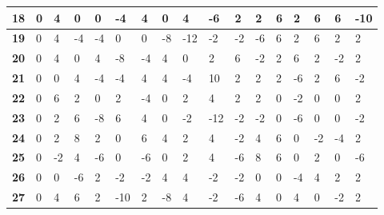 \begin{longtable}[c]{|l|l|l|l|l|l|l|l|l|l|l|l|l|l|l|l|l|}
\textbf{18} & 0          & 4          & 0          & 0          & -4         & 4          & 0          & 4          & -6         & 2          & 2           & 6           & 2           & 6           & 6           & -10          \\ \hline
\textbf{19} & 0          & 4          & -4         & -4         & 0          & 0          & -8         & -12        & -2         & -2         & -6          & 6           & 2           & 6           & 2           & 2            \\ \hline
\textbf{20} & 0          & 4          & 0          & 4          & -8         & -4         & 4          & 0          & 2          & 6          & -2          & 2           & 6           & 2           & -2          & 2            \\ \hline
\textbf{21} & 0          & 0          & 4          & -4         & -4         & 4          & 4          & -4         & 10         & 2          & 2           & 2           & -6          & 2           & 6           & -2           \\ \hline
\textbf{22} & 0          & 6          & 2          & 0          & 2          & -4         & 0          & 2          & 4          & 2          & 2           & 0           & -2          & 0           & 0           & 2            \\ \hline
\textbf{23} & 0          & 2          & 6          & -8         & 6          & 4          & 0          & -2         & -12        & -2         & -2          & 0           & -6          & 0           & 0           & -2           \\ \hline
\textbf{24} & 0          & 2          & 8          & 2          & 0          & 6          & 4          & 2          & 4          & -2         & 4           & 6           & 0           & -2          & -4          & 2            \\ \hline
\textbf{25} & 0          & -2         & 4          & -6         & 0          & -6         & 0          & 2          & 4          & -6         & 8           & 6           & 0           & 2           & 0           & -6           \\ \hline
\textbf{26} & 0          & 0          & -6         & 2          & -2         & -2         & 4          & 4          & -2         & -2         & 0           & 0           & -4          & 4           & 2           & 2            \\ \hline
\textbf{27} & 0          & 4          & 6          & 2          & -10        & 2          & -8         & 4          & -2         & -6         & 4           & 0           & 4           & 0           & -2          & 2            \\ \hline

\end{longtable}
